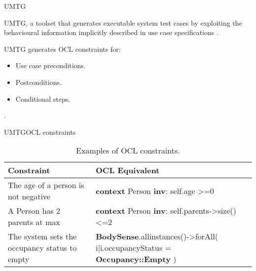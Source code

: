 \documentclass[10pt]{beamer}
\newcommand{\1}{
        	\setbeamertemplate{background}{
        		\texttt{[image: img/1]}
        		\tikz[overlay] \fill[fill opacity=0.75,fill=white] (0,0) rectangle (-\paperwidth,\paperheight);
        	}
}
\begin{document}
\begin{frame}{UMTG}{}	
	\begin{block}{}
		UMTG, a toolset that generates	executable system test cases by exploiting the behavioural	information implicitly described in use case specifications \cite{wang2015umtg}.
	\end{block}	

	\begin{block}{}
		UMTG generates OCL constraints for:
		\begin{itemize}
			\item Use case preconditions.
			\item Postconditions.
			\item Conditional steps.
		\end{itemize}.
	\end{block}	

\end{frame}

\begin{frame}{UMTG}{OCL constraints}	
\begin{table}
	\caption{Examples of OCL constraints.}
	\begin{tabular}{|p{4cm}|p{5.8cm}|}
		\hline 
		\textbf{Constraint} & \textbf{OCL Equivalent}   \\	\hline 
		The age of a person is not negative & \textbf{context} Person \textbf{inv}: self.age >=0 \\ \hline
		
		A Person has 2 parents at max & \textbf{context} Person \textbf{inv}: self.parents->size()<=2 \\ \hline	
		
		
		The system sets the occupancy status to empty & \textbf{BodySense}.allinstances()->forAll( i|i.occupancyStatus = \textbf{Occupancy::Empty} ) \\ \hline
		
	\end{tabular}
\end{table}	
\end{frame}
\end{document}
